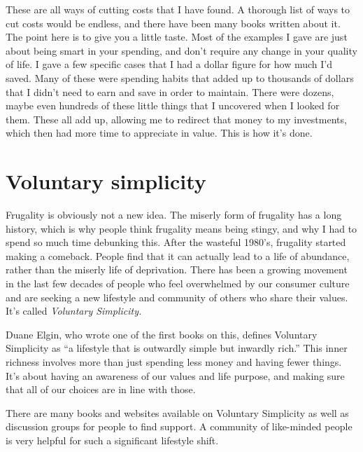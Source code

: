 These are all ways of cutting costs that I have found. A thorough list of ways to cut costs would be endless, and there have been many books written about it. The point here is to give you a little taste. Most of the examples I gave are just about being smart in your spending, and don't require any change in your quality of life. I gave a few specific cases that I had a dollar figure for how much I'd saved. Many of these were spending habits that added up to thousands of dollars that I didn't need to earn and save in order to maintain. There were dozens, maybe even hundreds of these little things that I uncovered when I looked for them. These all add up, allowing me to redirect that money to my investments, which then had more time to appreciate in value. This is how it's done.

\section{Voluntary simplicity}
Frugality is obviously not a new idea. The miserly form of frugality has a long history, which is why people think frugality means being stingy, and why I had to spend so much time debunking this. After the wasteful 1980's, frugality started making a comeback. People find that it can actually lead to a life of abundance, rather than the miserly life of deprivation. There has been a growing movement in the last few decades of people who feel overwhelmed by our consumer culture and are seeking a new lifestyle and community of others who share their values. It's called \emph{Voluntary Simplicity.}

Duane Elgin, who wrote one of the first books on this, defines Voluntary Simplicity as ``a lifestyle that is outwardly simple but inwardly rich.''\cite{voluntary-simplicity} This inner richness involves more than just spending less money and having fewer things. It's about having an awareness of our values and life purpose, and making sure that all of our choices are in line with those.

There are many books and websites available on Voluntary Simplicity as well as discussion groups for people to find support. A community of like-minded people is very helpful for such a significant lifestyle shift.

\newpage
